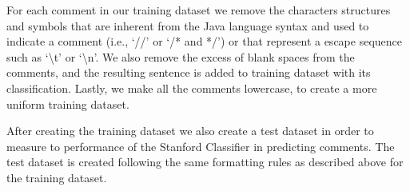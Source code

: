 For each comment in our training dataset we remove the characters structures and symbols that are inherent from the Java language syntax and used to indicate a comment (i.e., `//' or `/* and */') or that represent a escape sequence such as `\textbackslash t' or `\textbackslash n'. We also remove the excess of blank spaces from the comments, and the resulting sentence is added to training dataset with its classification. Lastly, we make all the comments lowercase, to create a more uniform training dataset.  

After creating the training dataset we also create a test dataset in order to measure to performance of the Stanford Classifier in predicting \SATD comments. The test dataset is created following the same formatting rules as described above for the training dataset. 

